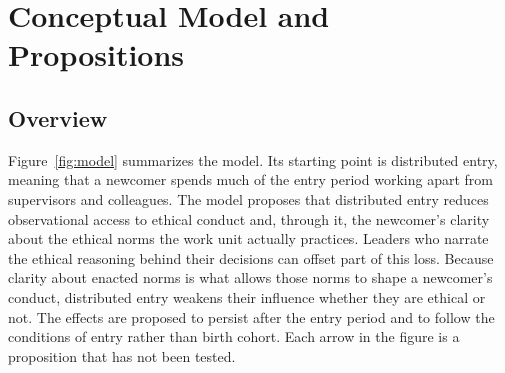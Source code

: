 \section{Conceptual Model and Propositions}
\subsection{Overview}

Figure~\ref{fig:model} summarizes the model. Its starting point is distributed entry, meaning that a newcomer spends much of the entry period working apart from supervisors and colleagues. The model proposes that distributed entry reduces observational access to ethical conduct and, through it, the newcomer's clarity about the ethical norms the work unit actually practices. Leaders who narrate the ethical reasoning behind their decisions can offset part of this loss. Because clarity about enacted norms is what allows those norms to shape a newcomer's conduct, distributed entry weakens their influence whether they are ethical or not. The effects are proposed to persist after the entry period and to follow the conditions of entry rather than birth cohort. Each arrow in the figure is a proposition that has not been tested.

